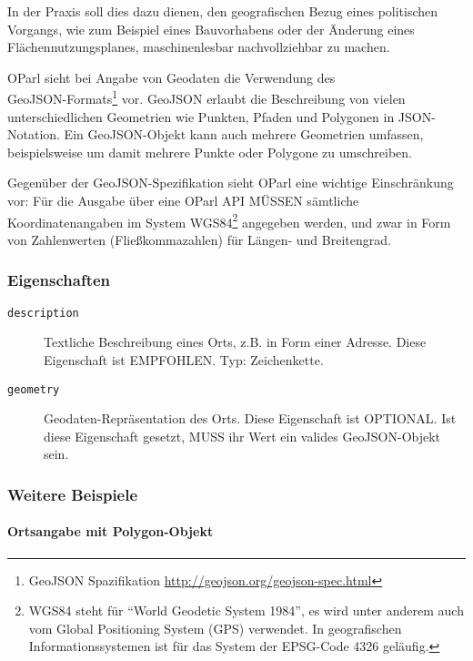 \documentclass[,a4paper]{article}
\begin{document}
In der Praxis soll dies dazu dienen, den geografischen Bezug eines
politischen Vorgangs, wie zum Beispiel eines Bauvorhabens oder der
Änderung eines Flächennutzungsplanes, maschinenlesbar nachvollziehbar zu
machen.

OParl sieht bei Angabe von Geodaten die Verwendung
des\\GeoJSON-Formats\footnote{GeoJSON Spazifikation
  \url{http://geojson.org/geojson-spec.html}} vor. GeoJSON erlaubt die
Beschreibung von vielen unterschiedlichen Geometrien wie Punkten, Pfaden
und Polygonen in JSON-Notation. Ein GeoJSON-Objekt kann auch mehrere
Geometrien umfassen, beispielsweise um damit mehrere Punkte oder
Polygone zu umschreiben.

Gegenüber der GeoJSON-Spezifikation sieht OParl eine wichtige
Einschränkung vor: Für die Ausgabe über eine OParl API MÜSSEN sämtliche
Koordinatenangaben im System WGS84\footnote{WGS84 steht für ``World
  Geodetic System 1984'', es wird unter anderem auch vom Global
  Positioning System (GPS) verwendet. In geografischen
  Informationssystemen ist für das System der EPSG-Code 4326 geläufig.}
angegeben werden, und zwar in Form von Zahlenwerten (Fließkommazahlen)
für Längen- und Breitengrad.

\subsubsection{Eigenschaften}\label{eigenschaften-9}

\begin{description}
\item[\texttt{description}]
Textliche Beschreibung eines Orts, z.B. in Form einer Adresse. Diese
Eigenschaft ist EMPFOHLEN. Typ: Zeichenkette.
\item[\texttt{geometry}]
Geodaten-Repräsentation des Orts. Diese Eigenschaft ist OPTIONAL. Ist
diese Eigenschaft gesetzt, MUSS ihr Wert ein valides GeoJSON-Objekt
sein.
\end{description}

\subsubsection{Weitere Beispiele}\label{weitere-beispiele}

\paragraph{Ortsangabe mit
Polygon-Objekt}\label{ortsangabe-mit-polygon-objekt}
\end{document}
